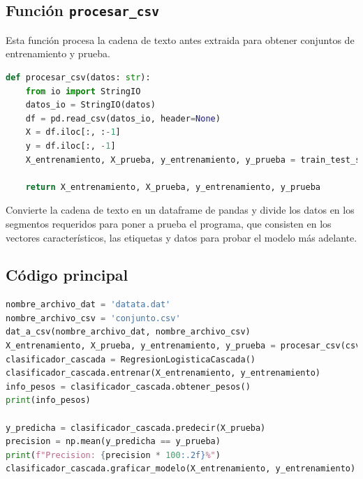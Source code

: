 \documentclass[12pt]{article}
\begin{document}
\vspace{1cm}

\subsection*{Función \texttt{procesar\_csv}}
Esta función procesa la cadena de texto antes extraida para obtener conjuntos de entrenamiento y prueba.
\vspace{1cm}

\begin{lstlisting}[language=Python]
def procesar_csv(datos: str):
    from io import StringIO
    datos_io = StringIO(datos)
    df = pd.read_csv(datos_io, header=None)
    X = df.iloc[:, :-1]
    y = df.iloc[:, -1]
    X_entrenamiento, X_prueba, y_entrenamiento, y_prueba = train_test_split(X, y, test_size=0.2, random_state=42)

    return X_entrenamiento, X_prueba, y_entrenamiento, y_prueba

\end{lstlisting}
\vspace{1cm}

Convierte la cadena de texto en un dataframe de pandas y divide los datos en los segmentos requeridos para poner a prueba el programa, que consisten en los vectores característicos, las etiquetas y datos para probar el modelo más adelante.

\vspace{1cm}

\subsection*{Código principal}

\begin{lstlisting}[language=Python]
nombre_archivo_dat = 'datata.dat'
nombre_archivo_csv = 'conjunto.csv'
dat_a_csv(nombre_archivo_dat, nombre_archivo_csv)
X_entrenamiento, X_prueba, y_entrenamiento, y_prueba = procesar_csv(csv_a_datos('conjunto.csv'))
clasificador_cascada = RegresionLogisticaCascada()
clasificador_cascada.entrenar(X_entrenamiento, y_entrenamiento)
info_pesos = clasificador_cascada.obtener_pesos()
print(info_pesos)

y_predicha = clasificador_cascada.predecir(X_prueba)
precision = np.mean(y_predicha == y_prueba)
print(f"Precision: {precision * 100:.2f}%")
clasificador_cascada.graficar_modelo(X_entrenamiento, y_entrenamiento)

\end{lstlisting}
\vspace{1cm}
\end{document}
